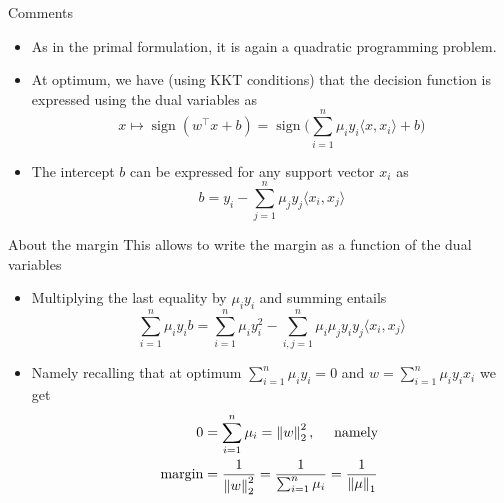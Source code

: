 \documentclass[xcolor={usenames,dvipsnames}]{beamer}
\begin{document}
\begin{frame}{Comments}

  \begin{itemize}
    \item As in the primal formulation, it is again a \alert{quadratic programming problem}.
    \item At optimum, we have (using KKT conditions) that the decision function is expressed using the dual variables as
    \begin{equation*}
      x \mapsto \mathop{sign}(w^\top x + b) = \mathop{sign}\Big(  \sum_{i=1}^n \mu_i y_i 
      \langle {x, x_i} \rangle  + b \Big)
    \end{equation*}
    \item The intercept $b$ can be expressed for any support vector $x_i$ as
    \begin{equation*}
      b = y_i -  \sum_{j=1}^n \mu_j y_j \langle {x_i, x_j} \rangle 
    \end{equation*}
    
  \end{itemize}
\end{frame}



\begin{frame}{About the margin}
This allows to write the margin as a function of the dual variables
\begin{itemize}
  \item Multiplying the last equality by $\mu_i y_i$ and summing entails
    \begin{equation*}
      \sum_{i=1}^n \mu_i y_i b =  \sum_{i=1}^n \mu_i y_i^2 - \sum_{i, j=1}^n \mu_i \mu_j y_i y_j \langle {x_i, x_j} \rangle 
    \end{equation*}
  \item Namely recalling that at optimum $\sum_{i=1}^n \mu_i y_i = 0$ and $w = \sum_{i=1}^n \mu_i y_i x_i$ we get
  \begin{align*}
    0 &= \sum_{i=1}^n \mu_i = \left\| w \right\|_2^2, \quad \text{ namely } \\
      \text{margin} &= \frac{1}{\left\| w \right\|_2^2} = \frac{1}{\sum_{i=1}^n \mu_i} 
    = \frac{1}{\left\| \mu \right\|_1}
  \end{align*}
\end{itemize}
\end{frame}


%  
%  
%
\end{document}
